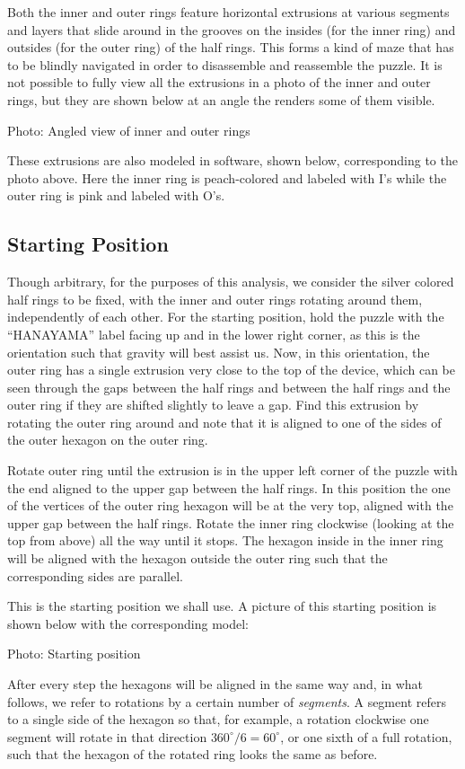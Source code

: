 \documentclass{article}
\newcommand{\photo}[1]{
      \begin{center}
            Photo: #1
      \end{center}
}
\begin{document}
Both the inner and outer rings feature horizontal extrusions at various segments and layers that slide around in the grooves on the insides (for the inner ring) and outsides (for the outer ring) of the half rings.
This forms a kind of maze that has to be blindly navigated in order to disassemble and reassemble the puzzle.
It is not possible to fully view all the extrusions in a photo of the inner and outer rings, but they are shown below at an angle the renders some of them visible.
\photo{Angled view of inner and outer rings}
These extrusions are also modeled in software, shown below, corresponding to the photo above.
Here the inner ring is peach-colored and labeled with I's while the outer ring is pink and labeled with O's.

\subsection{Starting Position}

Though arbitrary, for the purposes of this analysis, we consider the silver colored half rings to be fixed, with the inner and outer rings rotating around them, independently of each other.
For the starting position, hold the puzzle with the ``HANAYAMA'' label facing up and in the lower right corner, as this is the orientation such that gravity will best assist us.
Now, in this orientation, the outer ring has a single extrusion very close to the top of the device, which can be seen through the gaps between the half rings and between the half rings and the outer ring if they are shifted slightly to leave a gap.
Find this extrusion by rotating the outer ring around and note that it is aligned to one of the sides of the outer hexagon on the outer ring.

Rotate outer ring until the extrusion is in the upper left corner of the puzzle with the end aligned to the upper gap between the half rings.
In this position the one of the vertices of the outer ring hexagon will be at the very top, aligned with the upper gap between the half rings.
Rotate the inner ring clockwise (looking at the top from above) all the way until it stops.
The hexagon inside in the inner ring will be aligned with the hexagon outside the outer ring such that the corresponding sides are parallel.

This is the starting position we shall use.
A picture of this starting position is shown below with the corresponding model:
\photo{Starting position}
After every step the hexagons will be aligned in the same way and, in what follows, we refer to rotations by a certain number of \emph{segments}.
A segment refers to a single side of the hexagon so that, for example, a rotation clockwise one segment will rotate in that direction $360^\circ / 6 = 60^\circ$, or one sixth of a full rotation, such that the hexagon of the rotated ring looks the same as before.
\end{document}
